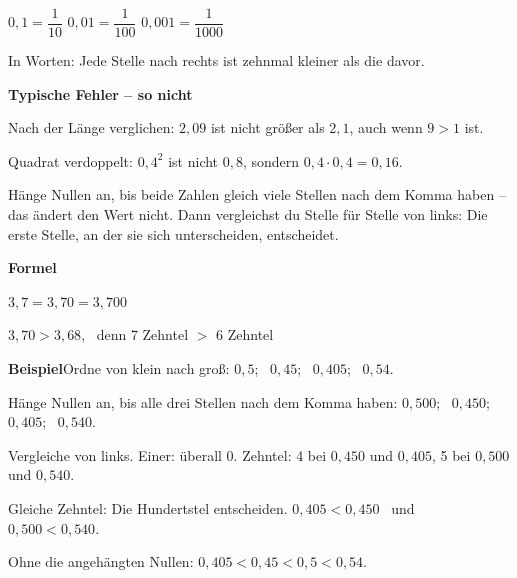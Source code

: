 \documentclass[11pt]{article}
\newcommand{\nr}[1]{\makebox[7mm][l]{\textbf{#1}}}
\begin{document}
\begin{tcolorbox}[colback=mbkasten,colframe=mbgrau,boxrule=0.5pt,arc=1mm,left=3mm,right=3mm,top=2mm,bottom=2mm,title={\bfseries Formel auf einen Blick},coltitle=black,colbacktitle=black!10]
{\Large $0{,}1 = \dfrac{1}{10}$ \qquad $0{,}01 = \dfrac{1}{100}$ \qquad $0{,}001 = \dfrac{1}{1000}$}\par\medskip
In Worten: Jede Stelle nach rechts ist zehnmal kleiner als die davor.\par\medskip
\end{tcolorbox}
\medskip\noindent\textbf{Typische Fehler – so nicht}\par\smallskip
\noindent\nr{$\times$}Nach der Länge verglichen: $2{,}09$ ist nicht größer als $2{,}1$, auch wenn $9 > 1$ ist.\par
\noindent\nr{$\times$}Quadrat verdoppelt: $0{,}4^2$ ist nicht $0{,}8$, sondern $0{,}4 \cdot 0{,}4 = 0{,}16$.\par
\clearpage\label{s:A}\noindent\colorbox{black!12}{}\hspace{3mm}{\Large\bfseries Vergleichen und ordnen}\par\smallskip
\noindent Hänge Nullen an, bis beide Zahlen gleich viele Stellen nach dem Komma haben – das ändert den Wert nicht. Dann vergleichst du Stelle für Stelle von links: Die erste Stelle, an der sie sich unterscheiden, entscheidet.\par\medskip
\noindent\textbf{Formel}\par\nopagebreak\noindent\hspace*{4mm}\begin{minipage}{\dimexpr\linewidth-4mm\relax}$3{,}7 = 3{,}70 = 3{,}700$ \par\vspace{4pt} $3{,}70 > 3{,}68$, \ denn 7 Zehntel $>$ 6 Zehntel\end{minipage}\par\medskip
\noindent\textbf{Beispiel}\quad Ordne von klein nach groß: $0{,}5$; \ $0{,}45$; \ $0{,}405$; \ $0{,}54$.\par\smallskip
\noindent\par\noindent{}Hänge Nullen an, bis alle drei Stellen nach dem Komma haben: $0{,}500$; \ $0{,}450$; \ $0{,}405$; \ $0{,}540$.\par\smallskip\par\noindent{}Vergleiche von links. Einer: überall 0. Zehntel: 4 bei $0{,}450$ und $0{,}405$, 5 bei $0{,}500$ und $0{,}540$.\par\smallskip\par\noindent{}Gleiche Zehntel: Die Hundertstel entscheiden. $0{,}405 < 0{,}450$ \ und \ $0{,}500 < 0{,}540$.\par\smallskip\par\noindent{}Ohne die angehängten Nullen: $0{,}405 < 0{,}45 < 0{,}5 < 0{,}54$.\par\smallskip\par\medskip
\end{document}
